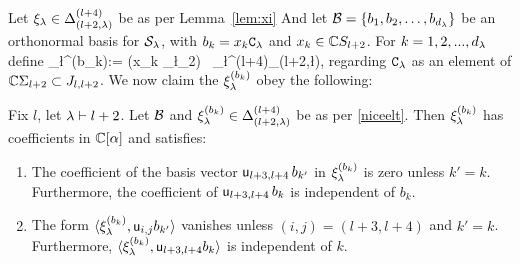 \mdef\label{niceelt} 
Let $\xi_{\lambda} \in \Delta^{(l+4)}_{(l+2,\lambda)}$ be as per Lemma~\ref{lem:xi} 
And let
$\mathcal{B}=\{b_1,b_2,\dots, b_{d_{\lambda}}\}$ be an orthonormal basis for $\mathcal{S}_\lambda$, with $b_k=x_k {\mathtt{C}}_\lambda$ and $x_k\in \mathbb{C} S_{l+2}$.
For $k =1,2,...,d_\lambda$ 
define 
\beq 
\xi_{\l}^{(b_k)}:= (x_k \nC_\l \otimes {}_2) \, \xi_\l \in \Delta^{(l+4)}_{(l+2,\l)}, 
\eq
regarding ${\mathtt{C}}_\lambda$ as an element of $\mathbb{C} \Sigma_{l+2}\subset J_{l,l+2}$. We now claim the $\xi_{\lambda}^{(b_k)}$ obey the following: 

\begin{lemma}\label{lem:niceelt} Fix $l$, let $\lambda \vdash l+2$. Let $\mathcal{B}$ and $\xi_{\lambda}^{(b_k)} \in \Delta^{(l+4)}_{(l+2,\lambda)} $ be as per \ref{niceelt}. Then $\xi_{\lambda}^{(b_k)}$ has coefficients in $\mathbb{C}[\alpha]$ and satisfies:
\begin{enumerate}
    \item The coefficient of the basis vector ${\mathsf u}_{l+3,l+4} \, b_{k'}$ in $\xi_{\lambda}^{(b_k)}$ is zero unless $k'=k$. Furthermore, the coefficient of ${\mathsf u}_{l+3,l+4} \, b_{k}$ is independent of $b_k$.
    \item  The form $\langle \xi_{\lambda}^{(b_k)}, {\mathsf u}_{i,j} b_{k'}  \rangle $ vanishes unless $(i,j)=(l+3,l+4)$ and $k'=k$. Furthermore, $\langle \xi_{\lambda}^{(b_k)}, {\mathsf u}_{l+3,l+4} b_{k}  \rangle $ is independent of $k$.
\end{enumerate}
\end{lemma}
